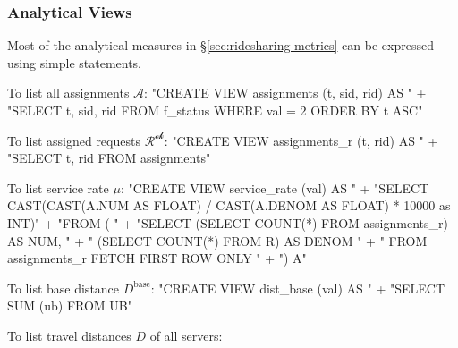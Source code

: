 \documentclass{article}
\def\nwendcode{\endtrivlist \endgroup}      %
\let\nwdocspar=\par
\theoremstyle{definition}                   %
\begin{document}
\subsubsection{Analytical Views}
Most of the analytical measures in \S\ref{sec:ridesharing-metrics} can
be expressed using simple statements.

To list all assignments $\mathcal{A}$:
\nwenddocs{}\endmoddef{}
"CREATE VIEW assignments (t, sid, rid) AS "
  + "SELECT t, sid, rid FROM f_status WHERE val = 2 ORDER BY t ASC"
\nwendcode{}\nwdocspar
To list assigned requests $\mathcal{R^\textrm{ok}}$:
\nwenddocs{}\endmoddef{}
"CREATE VIEW assignments_r (t, rid) AS "
  + "SELECT t, rid FROM assignments"
\nwendcode{}\nwdocspar
To list service rate $\mu$:
\nwenddocs{}\endmoddef{}
"CREATE VIEW service_rate (val) AS "
  + "SELECT CAST(CAST(A.NUM AS FLOAT) / CAST(A.DENOM AS FLOAT) * 10000 as INT)"
  + "FROM ( "
  + "SELECT (SELECT COUNT(*) FROM assignments_r) AS NUM, "
  + "       (SELECT COUNT(*) FROM R) AS DENOM "
  + "       FROM assignments_r FETCH FIRST ROW ONLY "
  + ") A"
\nwendcode{}\nwdocspar
To list base distance $D^\textrm{base}$:
\nwenddocs{}\endmoddef{}
"CREATE VIEW dist_base (val) AS "
  + "SELECT SUM (ub) FROM UB"
\nwendcode{}\nwdocspar
To list travel distances $D$ of all servers:
\nwenddocs{}\endmoddef{}
\end{document}

